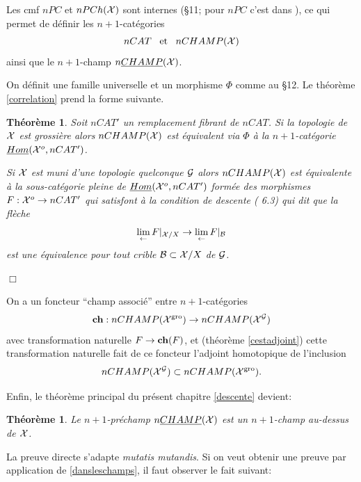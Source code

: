 \documentclass[12pt]{article}
\newcommand{\eop}{\hfill $\Box$\vspace{.1in}}
\newtheorem{theoreme}[lemma]{Th\'eor\`eme}
\newcommand{\Gg}{{\cal G}}
\newcommand{\Bb}{{\cal B}}
\newcommand{\Xx}{{\cal X}}
\begin{document}
Les cmf $nPC$ et $nPCh(\Xx )$ sont internes (\S 11; pour $nPC$ c'est dans
\cite{nCAT}), ce qui permet de d\'efinir les $n+1$-cat\'egories
$$
nCAT\;\;\; \mbox{et} \;\;\; nCHAMP(\Xx )
$$
ainsi que le $n+1$-champ $n\underline{CHAMP}(\Xx )$.

On d\'efinit une famille universelle et un morphisme $\Phi$ comme au \S 12.
Le th\'eor\`eme \ref{correlation} prend la forme suivante.


\begin{theoreme}
\label{correlationNdS}
Soit $nCAT'$ un remplacement fibrant de $nCAT$.
Si la topologie de $\Xx$ est
grossi\`ere alors $nCHAMP(\Xx )$ est \'equivalent via $\Phi$ \`a la
$n+1$-cat\'egorie $\underline{Hom}(\Xx ^o, nCAT')$.

Si $\Xx$ est muni d'une topologie quelconque
$\Gg$ alors $nCHAMP(\Xx )$ est \'equivalente \`a la sous-cat\'egorie
pleine de
$\underline{Hom}(\Xx ^o, nCAT')$ form\'ee des morphismes
$F:\Xx ^o\rightarrow nCAT'$ qui satisfont \`a la condition de descente
(\cite{limits} 6.3) qui dit que la fl\`eche
$$
\lim _{\leftarrow} F|_{\Xx /X} \rightarrow
\lim _{\leftarrow} F|_{\Bb}
$$
est une \'equivalence pour tout crible $\Bb \subset \Xx /X$ de $\Gg$.
\end{theoreme}
\eop

On a un foncteur ``champ associ\'e'' entre $n+1$-cat\'egories
$$
{\bf ch} : nCHAMP (\Xx ^{\rm gro})\rightarrow nCHAMP (\Xx ^{\Gg})
$$
avec transformation naturelle $F\rightarrow {\bf ch}(F)$,
et (th\'eor\`eme \ref{cestadjoint}) cette transformation
naturelle fait de ce foncteur l'adjoint homotopique de l'inclusion
$$
nCHAMP (\Xx ^{\Gg})\subset nCHAMP (\Xx ^{\rm gro}).
$$

Enfin, le th\'eor\`eme principal du pr\'esent chapitre \ref{descente}
devient:

\begin{theoreme}
\label{descenteNdS}
Le $n+1$-pr\'echamp  $n\underline{CHAMP}(\Xx )$ est un $n+1$-champ
au-dessus de $\Xx$.
\end{theoreme}

La preuve directe s'adapte {\em mutatis mutandis}. Si on veut obtenir une preuve
par application de \ref{dansleschamps}, il faut observer le fait suivant:
\end{document}
